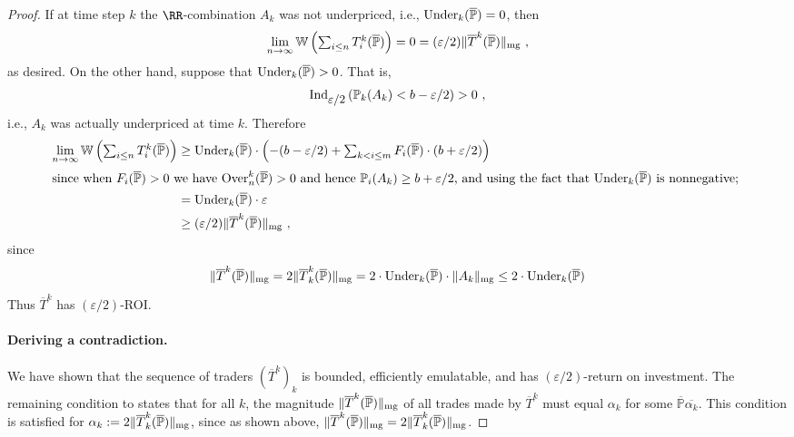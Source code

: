 \documentclass[authordate,onecolumn,noenvironments]{miri-tech-article}
\numberwithin{equation}{subsection}
\newcommand{\seq}[1]{{\overline{#1}}}
\newcommand{\pgenable}{\ensuremath{\MP}\text{-generable}\xspace}
\newcommand{\aff}{A}
\newcommand{\trade}{T}%
\newcommand{\Trader}{\seq{\trade}} %
\newcommand{\magnit}[1]{{\|#1\|_{\rm mg}}} %
\newcommand{\BelState}{\mathbb{P}}
\newcommand{\pt}{\BelState}
\newcommand{\MP}{\seq{\pt}}
\newcommand{\ftn}{(\MP)} %
\newcommand{\World}{\mathbb{W}}
\newcommand{\underpriced}{{\rm Under}}
\newcommand{\overpriced}{{\rm Over}}
\newcommand{\localportfoliovalue}{b}
\newcommand{\ctsind}[1]{\operatorname{Ind}_{\text{\small{${#1}$}}}} %
\begin{document}
\begin{proof}
If at time step $k$ the $\RR$-combination $\aff_k$ was not underpriced, i.e., $\underpriced_k (\MP)= 0$, then 
%
\[ \lim_{n \to\infty}\World\left( {\textstyle \sum_{i \leq n} \trade^k_i(\MP)}\right) = 0 = (\varepsilon/2)\magnit{\Trader^k(\MP)}\ ,  \]
%
as desired. On the other hand, suppose that $\underpriced_k(\MP)  > 0$. That is, 
%
\[ \ctsind{\varepsilon/2}\left( \pt_k(\aff_k) < \localportfoliovalue - \varepsilon/2
\right) >0 \ , \]
%
i.e., $\aff_k$ was actually underpriced at time $k$. Therefore
%
\begin{align*}
 \lim_{n \to\infty}\World\left( {\textstyle \sum_{i \leq n} \trade^k_i(\MP)}\right) 
 &\geq  \underpriced_k(\MP) \cdot
\left( {\textstyle -(\localportfoliovalue - \varepsilon/2)  + 
\sum_{k< i \leq m} F_i \ftn \cdot ( \localportfoliovalue + \varepsilon/2)
}\right)\\ 
\shortintertext{since when $F_i \ftn >0$ we have $\overpriced_n^k(\MP)>0$ and hence $ \pt_i(\aff_{k})  \geq \localportfoliovalue + \varepsilon/2$,
and using the fact that $\underpriced_k(\MP)$ is nonnegative; }
%
&= \underpriced_k(\MP) \cdot \varepsilon\\
&\geq (\varepsilon/2)\magnit{\Trader^k(\MP)}\ ,
\end{align*}
%
since 
%
\[ \magnit{\Trader^k(\MP)} = 2\magnit{\Trader^k_k(\MP)} = 2\cdot\underpriced_k(\MP) \cdot \magnit{\aff_k} \leq 2\cdot \underpriced_k(\MP) \]
%
Thus $\Trader^k$ has $(\varepsilon/2)$-ROI\@.

\paragraph{Deriving a contradiction.}

We have shown that the sequence of traders $(\Trader^k)_k$ is bounded, efficiently emulatable, and has $(\varepsilon/2)$-return on investment. 
The remaining condition to 
states that for all $k$, the magnitude $\magnit{\Trader^k(\MP)}$ of all trades made by $\Trader^k$ must equal $\alpha_k$ for some
\pgenable $\seq{\alpha_k}$. This condition is satisfied for $\alpha_k := 2\magnit{\Trader^k_k(\MP)}$, since as
shown above, $\magnit{\Trader^k(\MP)} = 2\magnit{\Trader^k_k(\MP)}$. 



\end{proof}
\end{document}
